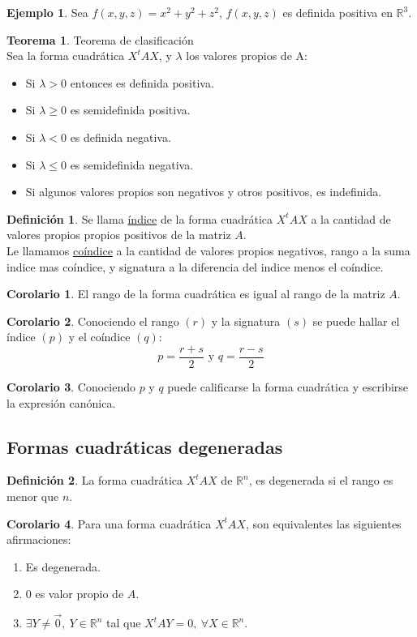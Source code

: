 \documentclass[10pt]{article}
\theoremstyle{definition}
\newtheorem{definition}{Definición}[section]
\newtheorem{theorem}{Teorema}[section]
\newtheorem{corollary}{Corolario}[theorem]
\newtheorem{example}{Ejemplo}[section]
\begin{document}
\begin{example}
    Sea $f(x,y,z)=x^2+y^2+z^2$, $f(x,y,z)$ es definida positiva en $\mathbb{R}^3$.
\end{example}
\begin{theorem}{Teorema de clasificación}
    \\Sea la forma cuadrática $X^tAX$, y $\lambda$ los valores propios de A:
    \begin{itemize}
        \item Si $\lambda>0$ entonces es definida positiva.
        \item Si $\lambda\ge0$ es semidefinida positiva.
        \item Si $\lambda<0$ es definida negativa.
        \item Si $\lambda\le0$ es semidefinida negativa.
        \item Si algunos valores propios son negativos y otros positivos, es indefinida.
    \end{itemize}
\end{theorem}
\begin{definition}
    Se llama \underline{índice} de la forma cuadrática $X^tAX$ a la cantidad de valores propios propios positivos de la matriz $A$.\\
    Le llamamos \underline{coíndice} a la cantidad de valores propios negativos, rango a la suma indice mas coíndice, y signatura a la diferencia del indice menos el coíndice.
\end{definition}
\begin{corollary}
    El rango de la forma cuadrática es igual al rango de la matriz $A$.
\end{corollary}
\begin{corollary}
    Conociendo el rango $(r)$ y la signatura $(s)$ se puede hallar el índice $(p)$ y el coíndice $(q)$: $$p=\frac{r+s}{2}\text{ y }q=\frac{r-s}{2}$$
\end{corollary}
\begin{corollary}
    Conociendo $p$ y $q$ puede calificarse la forma cuadrática y escribirse la expresión canónica.
\end{corollary}
\subsection{Formas cuadráticas degeneradas}
\begin{definition}
    La forma cuadrática $X^tAX$ de $\mathbb{R}^n$, es degenerada si el rango es menor que $n$.
\end{definition}
\begin{corollary}
    Para una forma cuadrática $X^tAX$, son equivalentes las siguientes afirmaciones:
    \begin{enumerate}
        \item Es degenerada.
        \item $0$ es valor propio de $A$.
        \item $\exists Y\neq\vec{0},\ Y\in\mathbb{R}^n$ tal que $X^tAY=0,\ \forall X\in\mathbb{R}^n$.
    \end{enumerate}
\end{corollary}
\end{document}
